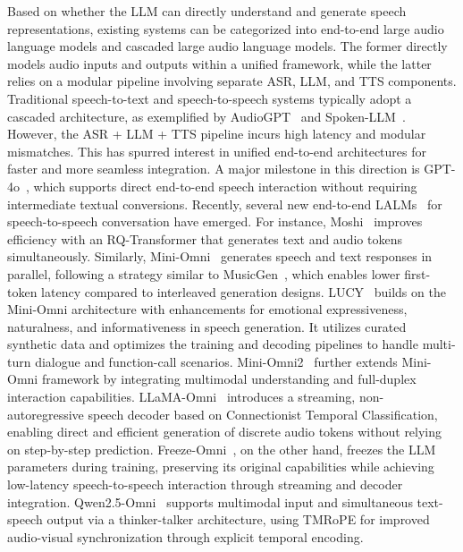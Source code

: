 Based on whether the LLM can directly understand and generate speech representations, existing systems can be categorized into end-to-end large audio language models and cascaded large audio language models. The former directly models audio inputs and outputs within a unified framework, while the latter relies on a modular pipeline involving separate ASR, LLM, and TTS components. Traditional speech-to-text and speech-to-speech systems typically adopt a cascaded architecture, as exemplified by AudioGPT~\cite{huang2024audiogpt} and Spoken-LLM~\cite{lin2024advancing}. However, the ASR + LLM + TTS pipeline incurs high latency and modular mismatches. This has spurred interest in unified end-to-end architectures for faster and more seamless integration. A major milestone in this direction is GPT-4o~\cite{hurst2024gpt}, which supports direct end-to-end speech interaction without requiring intermediate textual conversions. Recently, several new end-to-end LALMs~\cite{defossez2024moshi,fang2024llama,xie2024mini,xie2024mini2,xu2025qwen25omnitechnicalreport} for speech-to-speech conversation have emerged. For instance, Moshi~\cite{defossez2024moshi} improves efficiency with an RQ-Transformer that generates text and audio tokens simultaneously. Similarly, Mini-Omni~\cite{xie2024mini} generates speech and text responses in parallel, following a strategy similar to MusicGen~\cite{musicgen}, which enables lower first-token latency compared to interleaved generation designs. LUCY~\cite{gao2025lucylinguisticunderstandingcontrol} builds on the Mini-Omni architecture with enhancements for emotional expressiveness, naturalness, and informativeness in speech generation. It utilizes curated synthetic data and optimizes the training and decoding pipelines to handle multi-turn dialogue and function-call scenarios. Mini-Omni2~\cite{xie2024mini} further extends Mini-Omni framework by integrating multimodal understanding and full-duplex interaction capabilities. LLaMA-Omni~\cite{fang2024llama} introduces a streaming, non-autoregressive speech decoder based on Connectionist Temporal Classification, enabling direct and efficient generation of discrete audio tokens without relying on step-by-step prediction. Freeze-Omni~\cite{wang2024freeze}, on the other hand, freezes the LLM parameters during training, preserving its original capabilities while achieving low-latency speech-to-speech interaction through streaming and decoder integration. Qwen2.5-Omni~\cite{xu2025qwen25omnitechnicalreport} supports multimodal input and simultaneous text-speech output via a thinker-talker architecture, using TMRoPE for improved audio-visual synchronization through explicit temporal encoding.









